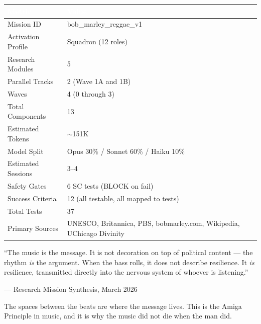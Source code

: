 \documentclass[11pt,letterpaper]{article}
\newcommand{\tableheader}[1]{\textbf{\sffamily\textcolor{white}{#1}}}
\begin{document}
\begin{center}
\begin{tabularx}{\textwidth}{L{4cm}X}
\toprule
{}
\tableheader{Metric} & \tableheader{Value} \\
\midrule
Mission ID & bob\_marley\_reggae\_v1 \\
Activation Profile & Squadron (12 roles) \\
Research Modules & 5 \\
Parallel Tracks & 2 (Wave 1A and 1B) \\
Waves & 4 (0 through 3) \\
Total Components & 13 \\
Estimated Tokens & $\sim$151K \\
Model Split & Opus 30\% / Sonnet 60\% / Haiku 10\% \\
Estimated Sessions & 3--4 \\
Safety Gates & 6 SC tests (BLOCK on fail) \\
Success Criteria & 12 (all testable, all mapped to tests) \\
Total Tests & 37 \\
Primary Sources & UNESCO, Britannica, PBS, bobmarley.com, Wikipedia, UChicago Divinity \\
\bottomrule
\end{tabularx}
\end{center}

\vspace{2em}
\begin{quotebox}
\begin{center}
{\large\sffamily\textcolor{primary}{``The music is the message. It is not decoration on top of political content --- the rhythm \textit{is} the argument. When the bass rolls, it does not describe resilience. It \textit{is} resilience, transmitted directly into the nervous system of whoever is listening.''}}

\vspace{0.8em}
{\small\sffamily\textcolor{subtlegray}{--- Research Mission Synthesis, March 2026}}

\vspace{0.8em}
{\small\sffamily\textcolor{secondary}{The spaces between the beats are where the message lives. This is the Amiga Principle in music, and it is why the music did not die when the man did.}}
\end{center}
\end{quotebox}
\end{document}

